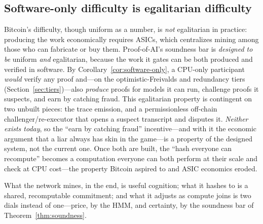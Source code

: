 \subsection{Software-only difficulty is egalitarian difficulty}

Bitcoin's difficulty, though uniform as a number, is \emph{not} egalitarian in
practice: producing the work economically requires ASICs, which centralizes mining
among those who can fabricate or buy them. Proof-of-AI's soundness bar is \emph{designed
to be} uniform \emph{and} egalitarian, because the work it gates can be both produced and
verified in software. By Corollary~\ref{cor:software-only}, a CPU-only participant
\emph{would} verify
any proof and---on the optimistic-Freivalds and redundancy tiers
(Section~\ref{sec:tiers})---also \emph{produce} proofs for models it can run,
challenge proofs it suspects, and earn by catching fraud. This egalitarian property is
contingent on two unbuilt pieces: the trace emission, and a permissionless off-chain
challenger/re-executor that opens a suspect transcript and disputes it. \emph{Neither
exists today}, so the ``earn by catching fraud'' incentive---and with it the economic
argument that a liar always has skin in the game---is a property of the designed system,
not the current one. Once both are built, the ``hash everyone can recompute'' becomes a
computation everyone can both perform at their scale and check at CPU cost---the property
Bitcoin aspired to and ASIC economics eroded.

What the network mines, in the end, is useful cognition; what it hashes to is a
shared, recomputable commitment; and what it adjusts as compute joins is two dials
instead of one---price, by the HMM, and certainty, by the soundness bar of
Theorem~\ref{thm:soundness}.
